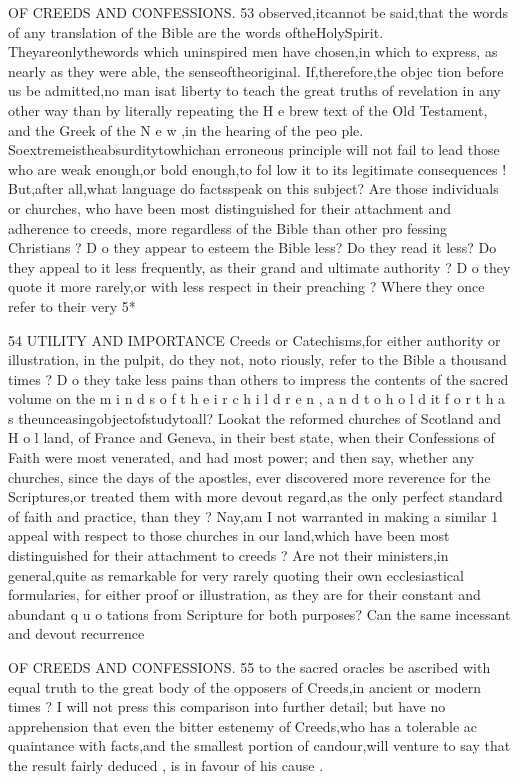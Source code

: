 \documentclass[
]{book}
\begin{document}
OF CREEDS AND CONFESSIONS. 53
observed,itcannot be said,that the words of any translation of the Bible are the words
oftheHolySpirit. Theyareonlythewords which uninspired men have chosen,in which to express, as nearly as they were able, the
senseoftheoriginal. If,therefore,the objec tion before us be admitted,no man isat liberty
to teach the great truths of revelation in any other way than by literally repeating the H e brew text of the Old Testament, and the Greek of the N e w ,in the hearing of the peo ple. Soextremeistheabsurditytowhichan erroneous principle will not fail to lead those who are weak enough,or bold enough,to fol low it to its legitimate consequences !
But,after all,what language do factsspeak on this subject? Are those individuals or churches, who have been most distinguished for their attachment and adherence to creeds, more regardless of the Bible than other pro fessing Christians ? D o they appear to esteem the Bible less? Do they read it less? Do they appeal to it less frequently, as their grand and ultimate authority ? D o they quote it more rarely,or with less respect in their preaching ? Where they once refer to their
very
5*

54
UTILITY AND IMPORTANCE
Creeds or Catechisms,for either authority or
illustration, in the pulpit, do they not, noto riously, refer to the Bible a thousand times ?
D o they take less pains than others to impress the contents of the sacred volume on the
m i n d s o f t h e i r c h i l d r e n , a n d t o h o l d it f o r t h a s theunceasingobjectofstudytoall? Lookat the reformed churches of Scotland and H o l land, of France and Geneva, in their best state, when their Confessions of Faith were most venerated, and had most power; and then say, whether any churches, since the days of the apostles, ever discovered more reverence for the Scriptures,or treated them with more devout regard,as the only perfect
standard of faith and practice, than they ?
Nay,am I not warranted in making a similar 1 appeal with respect to those churches in our land,which have been most distinguished for
their attachment to creeds ? Are not their ministers,in general,quite as remarkable for very rarely quoting their own ecclesiastical formularies, for either proof or illustration, as they are for their constant and abundant q u o tations from Scripture for both purposes? Can the same incessant and devout recurrence

OF CREEDS AND CONFESSIONS. 55
to the sacred oracles be ascribed with equal truth to the great body of the opposers of Creeds,in ancient or modern times ? I will not press this comparison into further detail; but have no apprehension that even the bitter estenemy of Creeds,who has a tolerable ac
quaintance with facts,and the smallest portion of candour,will venture to say that the result fairly deduced , is in favour of his cause .
\end{document}
